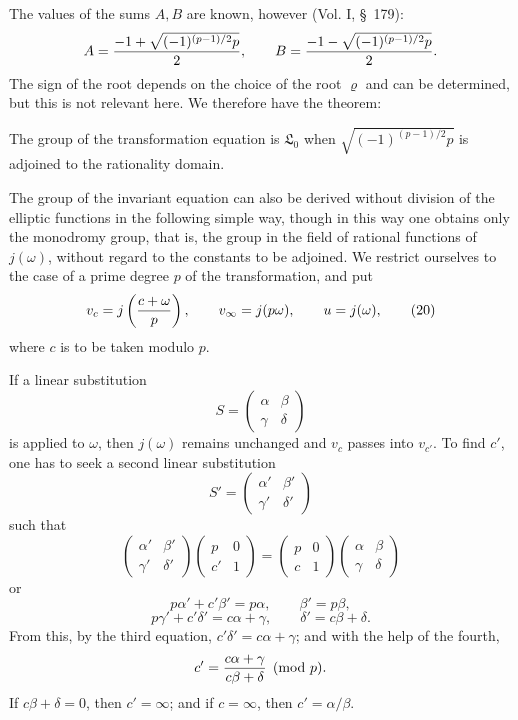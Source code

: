\documentclass[11pt]{article}
\begin{document}
The values of the sums $A,B$ are known, however (Vol. I, \S~179):
\[
 A={-1+\sqrt{(-1)^{(p-1)/2}p}\over2},
 \qquad
 B={-1-\sqrt{(-1)^{(p-1)/2}p}\over2}.
\]
The sign of the root depends on the choice of the root $\varrho$ and can be determined, but this is not relevant here. We therefore have the theorem:

The group of the transformation equation is $\mathfrak L_0$ when $\sqrt{(-1)^{(p-1)/2}p}$ is adjoined to the rationality domain.

The group of the invariant equation can also be derived without division of the elliptic functions in the following simple way, though in this way one obtains only the monodromy group, that is, the group in the field of rational functions of $j(\omega)$, without regard to the constants to be adjoined. We restrict ourselves to the case of a prime degree $p$ of the transformation, and put
\begin{equation}
 v_c=j\left({c+\omega\over p}\right),
 \qquad
 v_\infty=j(p\omega),
 \qquad
 u=j(\omega),
\tag{20}
\end{equation}
where $c$ is to be taken modulo $p$.

If a linear substitution
\[
 S=\begin{pmatrix}\alpha&\beta\\ \gamma&\delta\end{pmatrix}
\]
is applied to $\omega$, then $j(\omega)$ remains unchanged and $v_c$ passes into $v_{c'}$. To find $c'$, one has to seek a second linear substitution
\[
 S'=\begin{pmatrix}\alpha'&\beta'\\ \gamma'&\delta'\end{pmatrix}
\]
such that
\[
\begin{pmatrix}\alpha'&\beta'\\ \gamma'&\delta'\end{pmatrix}
\begin{pmatrix}p&0\\ c'&1\end{pmatrix}
=
\begin{pmatrix}p&0\\ c&1\end{pmatrix}
\begin{pmatrix}\alpha&\beta\\ \gamma&\delta\end{pmatrix}
\]
or
\[
 p\alpha'+c'\beta'=p\alpha,
 \qquad
 \beta'=p\beta,
\]
\[
 p\gamma'+c'\delta'=c\alpha+\gamma,
 \qquad
 \delta'=c\beta+\delta.
\]
From this, by the third equation, $c'\delta'=c\alpha+\gamma$; and with the help of the fourth,
\[
 c'={c\alpha+\gamma\over c\beta+\delta}\pmod p.
\]
If $c\beta+\delta=0$, then $c'=\infty$; and if $c=\infty$, then $c'=\alpha/\beta$.
\end{document}
